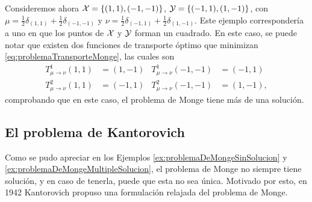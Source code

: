 {{	  \begin{example}\label{ex:problemaDeMongeMultipleSolucion}
		  Consideremos ahora $\mathcal{X} = \left\{ (1, 1), (-1, -1) \right\}$, $\mathcal{Y} = \left\{ (-1, 1), (1, -1) \right\}$, con $\mu = \frac{1}{2} \delta_{(1, 1)} + \frac{1}{2} \delta_{(-1, -1)}$ y $\nu = \frac{1}{2} \delta_{(-1, 1)} + \frac{1}{2} \delta_{(1, -1)}$. Este ejemplo correspondería a uno en que los puntos de $\mathcal{X}$ y $\mathcal{Y}$ forman un cuadrado. En este caso, se puede notar que existen dos funciones de transporte óptimo que minimizan \eqref{eq:problemaTransporteMonge}, las cuales son
		  \begin{align*}
			  T^1_{\mu\to\nu}(1, 1) & = (1, -1) & T^1_{\mu\to\nu}(-1, -1) & = (-1, 1)  \\
			  T^2_{\mu\to\nu}(1, 1) & = (-1, 1) & T^2_{\mu\to\nu}(-1, -1) & = (1, -1),
		  \end{align*}
		  comprobando que en este caso, el problema de Monge tiene más de una solución.
	  \end{example}




  }

  \subsection*{El problema de Kantorovich}
  {
	  Como se pudo apreciar en los Ejemplos \ref*{ex:problemaDeMongeSinSolucion} y \ref*{ex:problemaDeMongeMultipleSolucion}, el problema de Monge no siempre tiene solución, y en caso de tenerla, puede que esta no sea única.
	  Motivado por esto, en 1942 Kantorovich \cite{kantorovich1942translocation} propuso una formulación relajada del problema de Monge.

}}
